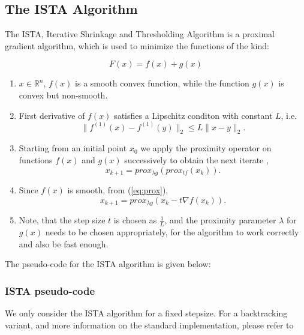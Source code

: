\subsection{The ISTA Algorithm}

The ISTA, Iterative Shrinkage and Thresholding Algorithm \cite{FISTA} is a proximal gradient algorithm, which is used to 
minimize the functions of the kind:

\begin{equation}
 F(x) = f(x) + g(x)
\end{equation}

\begin{enumerate}
 \item $x \in \mathbb{R}^n$, $f(x)$ is a smooth convex function, while the function $g(x)$ is convex but non-smooth.
 \item First derivative of $f(x)$ satisfies a Lipschitz conditon with constant $L$, i.e.
\begin{equation}
   \| f^{(1)}(x) - f^{(1)}(y)\|_2 \leq L \| x-y \|_2 .  
   \end{equation} 
 \item Starting from an initial point $x_0$ we apply the proximity operator on functions $f(x)$ and $g(x)$ successively to obtain the next iterate \cite{Proximal},
 \begin{equation}
  x_{k+1} = prox_{\lambda g}(prox_{tf}(x_k)).
 \end{equation}
 \item Since $f(x)$ is smooth, from (\ref{eq:prox}), 
 \begin{equation}
  x_{k+1} = prox_{\lambda g} \left( x_k - t \nabla f(x_k) \right).
 \end{equation} 
 \item Note, that the step size $t$ is chosen as $\frac{1}{L}$, and the proximity parameter $\lambda$ for $g(x)$ needs to be chosen appropriately, for the algorithm to work correctly and also be fast enough. 
 \end{enumerate}

The pseudo-code for the ISTA algorithm is given below:

\subsubsection{ISTA pseudo-code}
We only consider the ISTA algorithm for a fixed stepsize. 
For a backtracking variant, and more information on the standard implementation, please
refer to \cite{FISTA}

